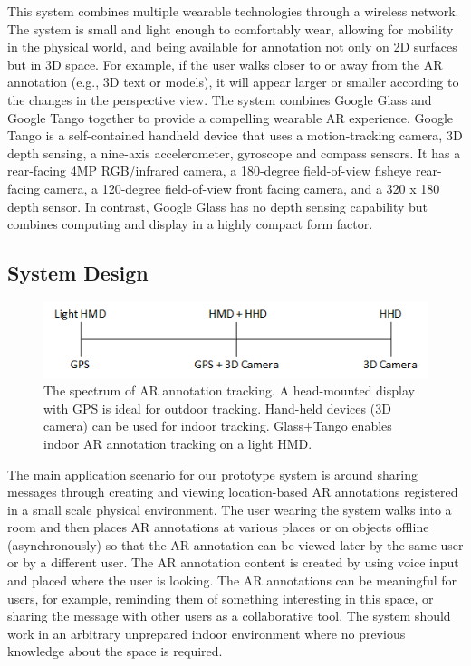 This system combines multiple wearable technologies through a wireless network. The system is small and light enough to comfortably wear, allowing for mobility in the physical world, and being available for annotation not only on 2D surfaces but in 3D space. For example, if the user walks closer to or away from the AR annotation (e.g., 3D text or models), it will appear larger or smaller according to the changes in the perspective view. The system combines Google Glass and Google Tango together to provide a compelling wearable AR experience. Google Tango is a self-contained handheld device that uses a motion-tracking camera, 3D depth sensing, a nine-axis accelerometer, gyroscope and compass sensors. It has a rear-facing 4MP RGB/infrared camera, a 180-degree field-of-view fisheye rear-facing camera, a 120-degree field-of-view front facing camera, and a 320 x 180 depth sensor. In contrast, Google Glass has no depth sensing capability but combines computing and display in a highly compact form factor. 



\subsection{System Design}

\begin{figure}[ht]
  \centering
  \includegraphics[width=.8\linewidth]{images/mgia15/tango_paper_continuum.png}
  \caption{The spectrum of AR annotation tracking. A head-mounted display with GPS is ideal for outdoor tracking. Hand-held devices (3D camera) can be used for indoor tracking. Glass+Tango enables indoor AR annotation tracking on a light HMD.}
  \label{fig:mgia15:spectrum}
\end{figure}

The main application scenario for our prototype system is around sharing messages through creating and viewing location-based AR annotations registered in a small scale physical environment. The user wearing the system walks into a room and then places AR annotations at various places or on objects offline (asynchronously) so that the AR annotation can be viewed later by the same user or by a different user. The AR annotation content is created by using voice input and placed where the user is looking. The AR annotations can be meaningful for users, for example, reminding them of something interesting in this space, or sharing the message with other users as a collaborative tool. The system should work in an arbitrary unprepared indoor environment where no previous knowledge about the space is required. 

